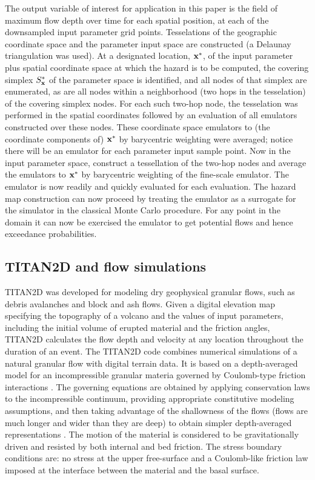 \documentclass[12pt]{article}
\begin{document}
The output variable of interest for application in this paper is the field of
maximum flow depth over time for each spatial position, at each of the
downsampled input parameter grid points.  Tesselations of the
geographic coordinate space and the parameter input space are
constructed (a Delaunay triangulation was used).  At a designated
location, ${\bf x}^*$, of the input parameter plus spatial coordinate
space at which the hazard is to be computed, the covering simplex
$S_{\bf x}^* $ of the parameter space is identified, and all nodes of
that simplex are enumerated, as are all nodes within a neighborhood
(two hops in the tesselation) of the covering simplex nodes.  For each
such two-hop node, the tesselation was performed in the spatial coordinates followed by an
evaluation of all emulators constructed over these nodes.  These
coordinate space emulators to (the coordinate components of) ${\bf
  x}^*$ by barycentric weighting were averaged; notice there will be an emulator for
each parameter input sample point. Now in the input parameter space,
construct a tessellation of the two-hop nodes and average the
emulators to ${\bf x}^*$ by barycentric weighting of the fine-scale
emulator.  The emulator is now readily and quickly evaluated for each
evaluation. The hazard map construction can now proceed by treating
the emulator as a surrogate for the simulator in the classical Monte
Carlo procedure.  For any point in the domain it can now be exercised the
emulator to get potential flows and hence exceedance probabilities.


\subsection{TITAN2D and flow simulations}

TITAN2D \citep{Patra2005, sheridan_2005} was developed for modeling dry geophysical granular flows,
such as debris avalanches and block and ash flows.  Given a digital
elevation map specifying the topography of a volcano and the values of
input parameters, including the initial volume of erupted material and
the friction angles, TITAN2D calculates the flow depth and velocity at
any location throughout the duration of an event.  The TITAN2D code
combines numerical simulations of a natural granular flow with digital
terrain data. It is based on a depth-averaged model for an
incompressible granular materia governed by Coulomb-type friction
interactions \citep{Savage1989}.  The governing equations are obtained
by applying conservation laws to the incompressible continuum,
providing appropriate constitutive modeling assumptions, and then
taking advantage of the shallowness of the flows (flows are much
longer and wider than they are deep) to obtain simpler depth-averaged
representations \citep{BuPaPi05}. The motion of the material is
considered to be gravitationally driven and resisted by both internal
and bed friction. The stress boundary conditions are: no stress at the
upper free-surface and a Coulomb-like friction law imposed at the
interface between the material and the basal surface.
\end{document}
